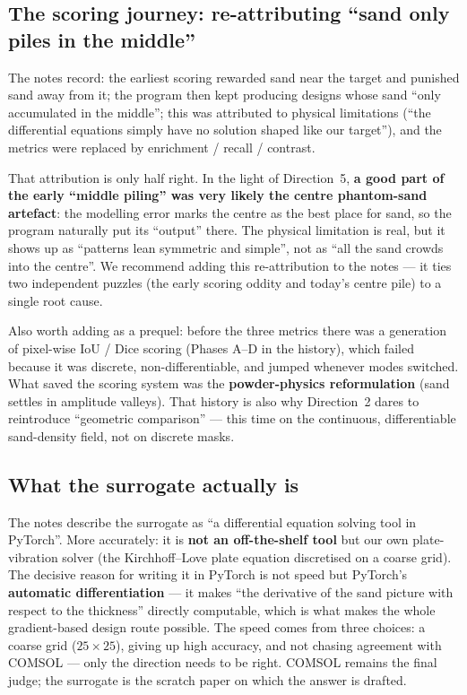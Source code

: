 \documentclass[11pt,a4paper]{article}
\begin{document}
\subsection{The scoring journey: re-attributing ``sand only piles in the middle''}

The notes record: the earliest scoring rewarded sand near the target and punished sand away from it; the program then kept producing designs whose sand ``only accumulated in the middle''; this was attributed to physical limitations (``the differential equations simply have no solution shaped like our target''), and the metrics were replaced by enrichment / recall / contrast.

That attribution is only half right. In the light of Direction~5, \textbf{a good part of the early ``middle piling'' was very likely the centre phantom-sand artefact}: the modelling error marks the centre as the best place for sand, so the program naturally put its ``output'' there. The physical limitation is real, but it shows up as ``patterns lean symmetric and simple'', not as ``all the sand crowds into the centre''. We recommend adding this re-attribution to the notes --- it ties two independent puzzles (the early scoring oddity and today's centre pile) to a single root cause.

Also worth adding as a prequel: before the three metrics there was a generation of pixel-wise IoU / Dice scoring (Phases A--D in the history), which failed because it was discrete, non-differentiable, and jumped whenever modes switched. What saved the scoring system was the \textbf{powder-physics reformulation} (sand settles in amplitude valleys). That history is also why Direction~2 dares to reintroduce ``geometric comparison'' --- this time on the continuous, differentiable sand-density field, not on discrete masks.

\subsection{What the surrogate actually is}

The notes describe the surrogate as ``a differential equation solving tool in PyTorch''. More accurately: it is \textbf{not an off-the-shelf tool} but our own plate-vibration solver (the Kirchhoff--Love plate equation discretised on a coarse grid). The decisive reason for writing it in PyTorch is not speed but PyTorch's \textbf{automatic differentiation} --- it makes ``the derivative of the sand picture with respect to the thickness'' directly computable, which is what makes the whole gradient-based design route possible. The speed comes from three choices: a coarse grid ($25\times 25$), giving up high accuracy, and not chasing agreement with COMSOL --- only the direction needs to be right. COMSOL remains the final judge; the surrogate is the scratch paper on which the answer is drafted.
\end{document}
